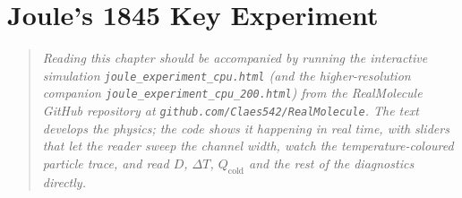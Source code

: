 



\fi  %




\chapter{Joule's 1845 Key Experiment}\label{ch:joule}

\begin{quote}\itshape
Reading this chapter should be accompanied by running the interactive
simulation \texttt{joule\_experiment\_cpu.html} (and the higher-resolution
companion \texttt{joule\_experiment\_cpu\_200.html}) from the RealMolecule
GitHub repository at \texttt{github.com/Claes542/RealMolecule}. The text
develops the physics; the code shows it happening in real time, with sliders
that let the reader sweep the channel width, watch the temperature-coloured
particle trace, and read $D$, $\Delta T$, $Q_{\mathrm{cold}}$ and the rest
of the diagnostics directly.
\end{quote}

